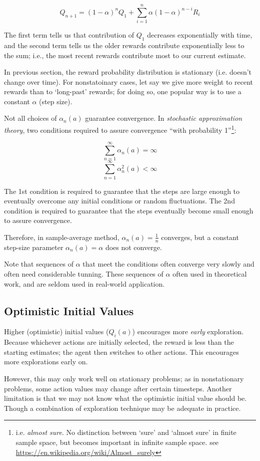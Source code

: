 \documentclass[lang=en,mode=geye,device=normal,color=blue,14pt]{elegantnote}
\DeclareMathOperator*{\1}{\mathbbm{1}}
\begin{document}
$$ Q_{n+1} = (1-\alpha)^n Q_1 + \sum_{i=1}^n \alpha (1-\alpha)^{n-i} R_i$$

The first term tells us that contribution of $Q_1$ decreases exponentially with time, and the second term tells us the older rewards contribute exponentially less to the sum; i.e., the most recent rewards contribute most to our current estimate.

In previous section, the reward probability distribution is stationary (i.e. doesn't change over time).
For nonstatoinary cases, let say we give more weight to recent rewards than to `long-past' rewards; for doing so, one popular way is to use a constant $\alpha$ (step size).

Not all choices of $\alpha_n(a)$ guarantee convergence.
In \textit{stochastic approximation theory}, two conditions required to assure convergence ``with probability 1''\footnote{i.e. \textit{almost sure}. No distinction between `sure' and `almost sure' in finite sample space, but becomes important in infinite sample space. see \url{https://en.wikipedia.org/wiki/Almost_surely}}:

$$ \sum_{n=1}^\infty \alpha_n(a) = \infty $$
$$ \sum_{n=1}^\infty \alpha_n^2(a) < \infty $$

The 1st condition is required to guarantee that the steps are large enough to eventually overcome any initial conditions or random fluctuations.
The 2nd condition is required to guarantee that the steps eventually become small enough to assure convergence.

Therefore, in sample-average method, $\alpha_n(a) = \frac{1}{n}$ converges, but a constant step-size parameter $\alpha_n(a)=\alpha$ does not converge.

Note that sequences of $\alpha$ that meet the conditions often converge very slowly and often need considerable tunning.
These sequences of $\alpha$ often used in theoretical work, and are seldom used in real-world application.

\subsection{Optimistic Initial Values}

Higher (optimistic) initial values ($Q_i(a)$) encourages more \textit{early} exploration. Because whichever actions are initially selected, the
reward is less than the starting estimates; the agent then switches to other actions. This encourages more explorations early on.

However, this may only work well on stationary problems; as in nonstationary problems, some action values may change after certain timesteps. Another limitation is that we may not know what the optimistic initial value should be. Though a combination of exploration technique may be adequate in practice.
\end{document}
